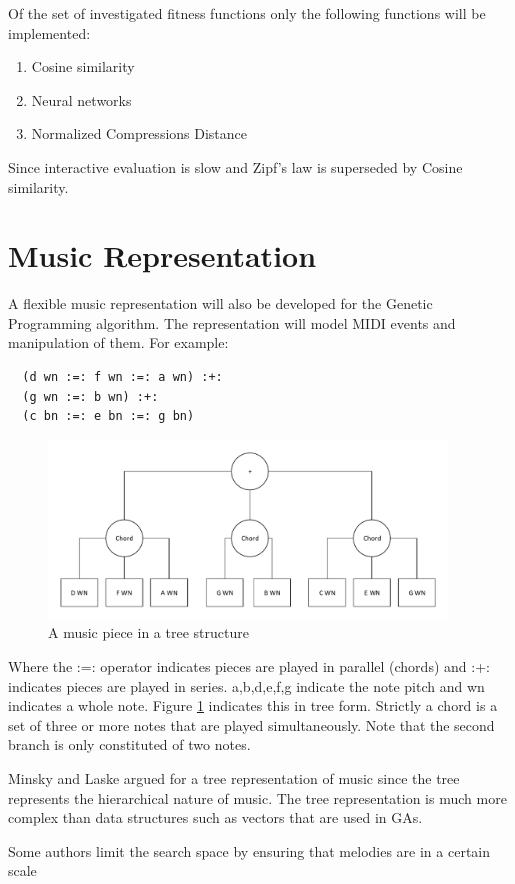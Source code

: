 Of the set of investigated fitness functions only the following functions will be implemented:
\begin{enumerate}
\item Cosine similarity
\item Neural networks
\item Normalized Compressions Distance
\end{enumerate}
Since interactive evaluation is slow and Zipf's law is superseded by Cosine similarity.

\section{Music Representation}
A flexible music representation will also be developed for the Genetic Programming algorithm. The representation will model \ac{MIDI} events and manipulation of them.
For example:
\begin{lstlisting}
  (d wn :=: f wn :=: a wn) :+:
  (g wn :=: b wn) :+:
  (c bn :=: e bn :=: g bn)
\end{lstlisting}
\begin{figure}
\center
\includegraphics[width=400px]{../images/tree_stuct_piece.pdf}
\caption{A music piece in a tree structure}
\label{ims:musicpieceextrree}
\end{figure}
Where the :=: operator indicates pieces are played in parallel (chords) and :+: indicates pieces are played in series. a,b,d,e,f,g indicate the note pitch and wn indicates a whole note.
Figure \ref{ims:musicpieceextrree} indicates this in tree form. Strictly a chord is a set of three or more notes that are played simultaneously. Note that the second branch is only constituted of two notes.

Minsky and Laske \cite{Minsky1992} argued for a tree representation of music since the tree represents the hierarchical nature of music. The tree representation is much more complex than data structures such as vectors that are used in \acp{GA}.

Some authors \cite{Biles1994} limit the search space by ensuring that melodies are in a certain scale 

